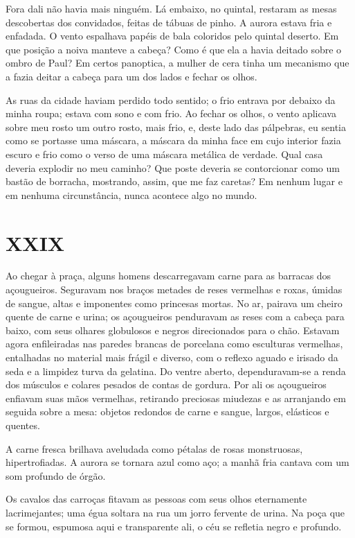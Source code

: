 Fora dali não havia mais ninguém. Lá embaixo, no quintal, restaram as mesas descobertas dos convidados, feitas de tábuas de pinho. A aurora estava fria e enfadada. O vento espalhava papéis de bala coloridos pelo quintal deserto. Em que posição a noiva manteve a cabeça? Como é que ela a havia deitado sobre o ombro de Paul? Em certos panoptica, a mulher de cera tinha um mecanismo que a fazia deitar a cabeça para um dos lados e fechar os olhos.

As ruas da cidade haviam perdido todo sentido; o frio entrava por debaixo da minha roupa; estava com sono e com frio. Ao fechar os olhos, o vento aplicava sobre meu rosto um outro rosto, mais frio, e, deste lado das pálpebras, eu sentia como se portasse uma máscara, a máscara da minha face em cujo interior fazia escuro e frio como o verso de uma máscara metálica de verdade. Qual casa deveria explodir no meu caminho? Que poste deveria se contorcionar como um bastão de borracha, mostrando, assim, que me faz caretas? Em nenhum lugar e em nenhuma circunstância, nunca acontece algo no mundo.


\chapter*{\centering\Large{XXIX}}

Ao chegar à praça, alguns homens descarregavam carne para as barracas dos açougueiros. Seguravam nos braços metades de reses vermelhas e roxas, úmidas de sangue, altas e imponentes como princesas mortas. No ar, pairava um cheiro quente de carne e urina; os açougueiros penduravam as reses com a cabeça para baixo, com seus olhares globulosos e negros direcionados para o chão. Estavam agora enfileiradas nas paredes brancas de porcelana como esculturas vermelhas, entalhadas no material mais frágil e diverso, com o reflexo aguado e irisado da seda e a limpidez turva da gelatina. Do ventre aberto, dependuravam-se a renda dos músculos e colares pesados de contas de gordura. Por ali os açougueiros enfiavam suas mãos vermelhas, retirando preciosas miudezas e as arranjando em seguida sobre a mesa: objetos redondos de carne e sangue, largos, elásticos e quentes.

A carne fresca brilhava aveludada como pétalas de rosas monstruosas, hipertrofiadas. A aurora se tornara azul como aço; a manhã fria cantava com um som profundo de órgão.

Os cavalos das carroças fitavam as pessoas com seus olhos eternamente lacrimejantes; uma égua soltara na rua um jorro fervente de urina. Na poça que se formou, espumosa aqui e transparente ali, o céu se refletia negro e profundo.

